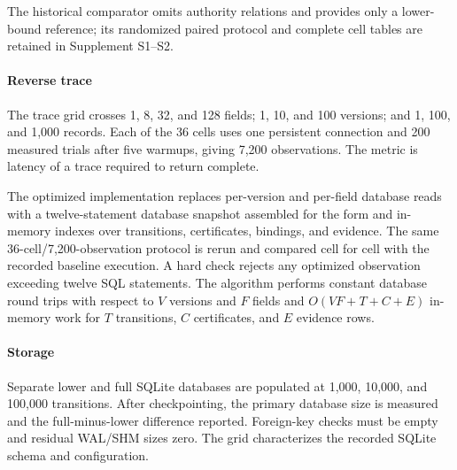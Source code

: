 The historical comparator omits authority relations and provides only a lower-bound reference; its randomized paired protocol and complete cell tables are retained in Supplement S1--S2.

\paragraph{Reverse trace}
The trace grid crosses 1, 8, 32, and 128 fields; 1, 10, and 100 versions; and 1, 100, and 1,000 records. Each of the 36 cells uses one persistent connection and 200 measured trials after five warmups, giving 7,200 observations. The metric is latency of a trace required to return complete.

The optimized implementation replaces per-version and per-field database reads with a twelve-statement database snapshot assembled for the form and in-memory indexes over transitions, certificates, bindings, and evidence. The same 36-cell/7,200-observation protocol is rerun and compared cell for cell with the recorded baseline execution. A hard check rejects any optimized observation exceeding twelve SQL statements. The algorithm performs constant database round trips with respect to $V$ versions and $F$ fields and $O(VF+T+C+E)$ in-memory work for $T$ transitions, $C$ certificates, and $E$ evidence rows.

\paragraph{Storage}
Separate lower and full SQLite databases are populated at 1,000, 10,000, and 100,000 transitions. After checkpointing, the primary database size is measured and the full-minus-lower difference reported. Foreign-key checks must be empty and residual WAL/SHM sizes zero. The grid characterizes the recorded SQLite schema and configuration.
